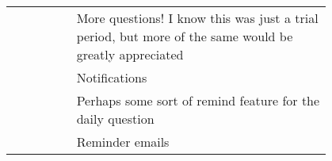 {\begin{longtable}{R|p{0.8\linewidth}}
		& More questions!  I know this was just a trial period, but more of the same would be greatly appreciated                                                                                                                                                                                                                                                                                                                                                                                                                                                                                                                                                                                                                                          \\
		& Notifications                                                                                                                                                                                                                                                                                                                                                                                                                                                                                                                                                                                                                                                                                                                                    \\
		& Perhaps some sort of remind feature for the daily question                                                                                                                                                                                                                                                                                                                                                                                                                                                                                                                                                                                                                                                                                       \\
		& Reminder emails                                                                                                                                                                                                                                                                                                                                                                                                                                                                                                                                                                                                                                                                                                                                  \\

\end{longtable}}
